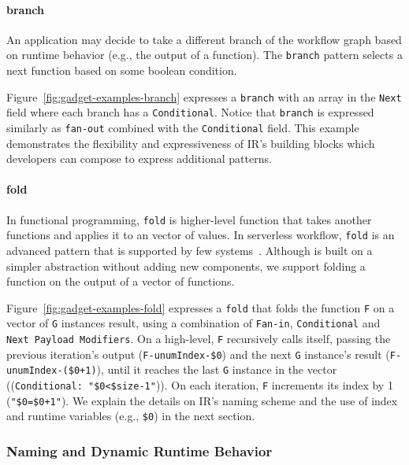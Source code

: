 \paragraph{branch}

An application may decide to take a different branch of the workflow graph
based on runtime behavior (e.g., the output of a function). The
\texttt{branch} pattern selects a next function based on some boolean
condition.

Figure~\ref{fig:gadget-examples-branch} expresses a \texttt{branch} with an
array in the \texttt{Next} field where each branch has a \texttt{Conditional}.
Notice that \texttt{branch} is expressed similarly as \texttt{fan-out}
combined with the \texttt{Conditional} field. This example demonstrates the
flexibility and expressiveness of \name{} IR's building blocks which
developers can compose to express additional patterns.

\paragraph{fold}

In functional programming, \texttt{fold} is higher-level function that takes
another functions and applies it to an vector of values. In serverless
workflow, \texttt{fold} is an advanced pattern that is supported by few
systems~\cite{azure-functions}. Although \name{} is built on a simpler
abstraction without adding new components, we support folding a function on
the output of a vector of functions.

Figure~\ref{fig:gadget-examples-fold} expresses a \texttt{fold} that folds the
function \texttt{F} on a vector of \texttt{G} instances result, using a
combination of \texttt{Fan-in}, \texttt{Conditional} and \texttt{Next Payload
Modifiers}. On a high-level, \texttt{F} recursively calls itself, passing the
previous iteration's output (\texttt{F-unumIndex-\$0}) and the next \texttt{G}
instance's result (\texttt{F-unumIndex-(\$0+1)}), until it reaches the last
\texttt{G} instance in the vector ((\texttt{Conditional: "\$0<\$size-1"})). On
each iteration, \texttt{F} increments its index by 1 (\texttt{"\$0=\$0+1"}).
We explain the details on \name{} IR's naming scheme and the use of index and
runtime variables (e.g., \texttt{\$0}) in the next section.


\subsubsection{Naming and Dynamic Runtime Behavior}\label{sec:ir:naming}

